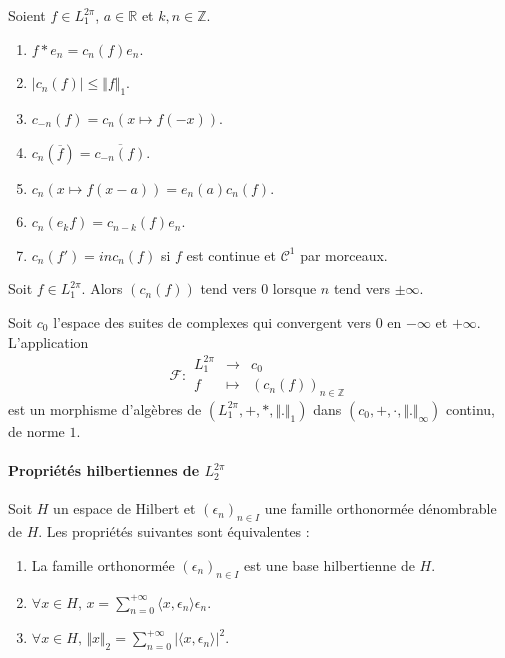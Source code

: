 	\begin{proposition}
		Soient $f \in L_1^{2 \pi}$, $a \in \mathbb{R}$ et $k, n \in \mathbb{Z}$.
		\begin{enumerate}[label=(\roman*)]
			\item $f * e_n = c_n(f) e_n$.
			\item $\vert c_n(f) \vert \leq \Vert f \Vert_1$.
			\item $c_{-n}(f) = c_n(x \mapsto f(-x))$.
			\item $c_n(\overline{f}) = \overline{c_{-n}(f)}$.
			\item $c_n(x \mapsto f(x-a)) = e_n(a) c_n(f)$.
			\item $c_n(e_k f) = c_{n-k}(f) e_n$.
			\item $c_n(f') = in c_n(f)$ si $f$ est continue et $\mathcal{C}^1$ par morceaux.
		\end{enumerate}
	\end{proposition}


	\begin{lemma}
		Soit $f \in L_1^{2 \pi}$. Alors $(c_n(f))$ tend vers $0$ lorsque $n$ tend vers $\pm \infty$.
	\end{lemma}

	\begin{theorem}
		\label{246-1}
		Soit $c_0$ l'espace des suites de complexes qui convergent vers $0$ en $-\infty$ et $+\infty$. L'application
		\[
		\mathcal{F} :
		\begin{array}{ccc}
			L_1^{2\pi} &\rightarrow& c_0 \\
			f &\mapsto& (c_n(f))_{n \in \mathbb{Z}}
		\end{array}
		\]
		est un morphisme d'algèbres de $(L_1^{2\pi}, +, *, \Vert . \Vert_1)$ dans $(c_0, +, \cdot, \Vert . \Vert_\infty)$ continu, de norme $1$.
	\end{theorem}

	\paragraph{Propriétés hilbertiennes de \texorpdfstring{$L_2^{2 \pi}$}{L₂²ᵖⁱ}}


	\begin{theorem}
		\label{246-2}
		Soit $H$ un espace de Hilbert et $(\epsilon_n)_{n \in I}$ une famille orthonormée dénombrable de $H$. Les propriétés suivantes sont équivalentes :
		\begin{enumerate}[label=(\roman*)]
			\item La famille orthonormée $(\epsilon_n)_{n \in I}$ est une base hilbertienne de $H$.
			\item $\forall x \in H, \, x = \sum_{n=0}^{+\infty} \langle x, \epsilon_n \rangle \epsilon_n$.
			\item \label{246-3} $\forall x \in H, \, \Vert x \Vert_2 = \sum_{n=0}^{+\infty} \vert \langle x, \epsilon_n \rangle \vert^2$.
		\end{enumerate}
	\end{theorem}

